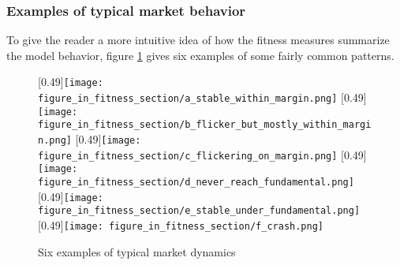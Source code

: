 \subsubsection{Examples of typical market behavior}
To give the reader a more intuitive idea of how the fitness measures summarize the model behavior, figure \ref{figure:typical_fitness_cases} gives six examples of some fairly common patterns.
\begin{figure}
\centering
{}
[0.49\linewidth]{\texttt{[image: figure\_in\_fitness\_section/a\_stable\_within\_margin.png]}}
[0.49\linewidth]{\texttt{[image: figure\_in\_fitness\_section/b\_flicker\_but\_mostly\_within\_margin.png]}}
[0.49\linewidth]{\texttt{[image: figure\_in\_fitness\_section/c\_flickering\_on\_margin.png]}}
[0.49\linewidth]{\texttt{[image: figure\_in\_fitness\_section/d\_never\_reach\_fundamental.png]}}
[0.49\linewidth]{\texttt{[image: figure\_in\_fitness\_section/e\_stable\_under\_fundamental.png]}}
[0.49\linewidth]{\texttt{[image: figure\_in\_fitness\_section/f\_crash.png]}}
\caption{Six examples of typical market dynamics}
\label{figure:typical_fitness_cases}
\end{figure}





\begin{comment}
\begin{figure}
\centering
\subcaptionbox{Market with fairly stable prices, but flickering over and under the stability margin. \label{figure:tradeprice_exaples_fitness_a}}
[0.49\linewidth]{\texttt{[image: issue\_113\_tradeprice\_plots/all/low\_stdev\_but\_not\_stable.png]}}
\subcaptionbox{\label{figure:tradeprice_exaples_fitness_b}}
[0.49\linewidth]{\texttt{[image: issue\_113\_tradeprice\_plots/all/low\_stdev\_and\_stable.png]}}
\subcaptionbox{\label{figure:tradeprice_exaples_fitness_c}}
[0.49\linewidth]{\texttt{[image: issue\_113\_tradeprice\_plots/all/high\_stdev\_but\_stable.png]}}
\caption{title}
\label{figure:tradeprice_exaples_fitness}
\end{figure}
\end{comment}



